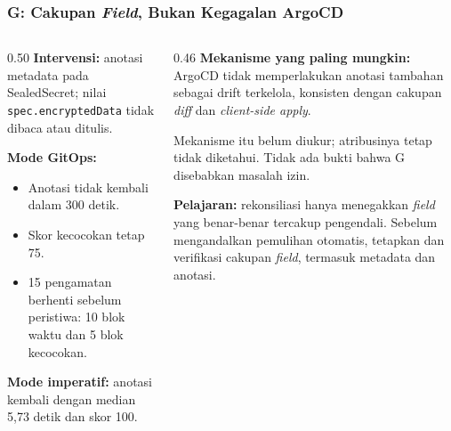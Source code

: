 {
\usebackgroundtemplate{\backgroundcontent}
\begin{frame}
    \frametitle{G: Cakupan \textit{Field}, Bukan Kegagalan ArgoCD}
    \begin{columns}[T]
        \begin{column}{0.50\textwidth}
            \scriptsize
            \textbf{Intervensi:} anotasi metadata pada SealedSecret; nilai \texttt{spec.encryptedData} tidak dibaca atau ditulis.
            \vspace{0.06cm}

            \textbf{Mode GitOps:}
            \begin{itemize}\setlength{\itemsep}{2pt}
                \item Anotasi tidak kembali dalam 300 detik.
                \item Skor kecocokan tetap 75.
                \item 15 pengamatan berhenti sebelum peristiwa: 10 blok waktu dan 5 blok kecocokan.
            \end{itemize}
            \vspace{0.04cm}
            \textbf{Mode imperatif:} anotasi kembali dengan median 5,73 detik dan skor 100.
        \end{column}
        \begin{column}{0.46\textwidth}
            \scriptsize
            \textbf{Mekanisme yang paling mungkin:} ArgoCD tidak memperlakukan anotasi tambahan sebagai drift terkelola, konsisten dengan cakupan \textit{diff} dan \textit{client-side apply}.
            \vspace{0.06cm}

            Mekanisme itu belum diukur; atribusinya tetap tidak diketahui. Tidak ada bukti bahwa G disebabkan masalah izin.
            \vspace{0.06cm}

            \textbf{Pelajaran:} rekonsiliasi hanya menegakkan \textit{field} yang benar-benar tercakup pengendali. Sebelum mengandalkan pemulihan otomatis, tetapkan dan verifikasi cakupan \textit{field}, termasuk metadata dan anotasi.
        \end{column}
    \end{columns}
    \vspace{0.04cm}
\end{frame}
}

